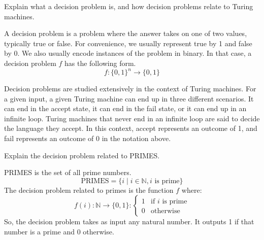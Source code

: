 \documentclass[a4paper, 12pt]{exam}
\begin{document}
\begin{questions}
\begin{solution}
  \end{solution}


\question
  Explain what a decision problem is, and how decision problems relate to Turing machines.
  \begin{solution}
    A decision problem is a problem where the answer takes on one of two values, typically true or false.
    For convenience, we usually represent true by 1 and false by 0.
    We also usually encode instances of the problem in binary.
    In that case, a decision problem $f$ has the following form.
      \[ f:\{0,1\}^n \rightarrow \{0,1\} \]
    
    Decision problems are studied extensively in the context of Turing machines.
    For a given input, a given Turing machine can end up in three different scenarios.
    It can end in the accept state, it can end in the fail state, or it can end up in an infinite loop.
    Turing machines that never end in an infinite loop are said to decide the language they accept.
    In this context, accept represents an outcome of 1, and fail represents an outcome of 0 in the notation above.
  \end{solution}


\question
  Explain the decision problem related to PRIMES.
  \begin{solution}
    PRIMES is the set of all prime numbers.
      $$ \textrm{PRIMES} = \{ i \mid i \in \mathbb{N} , i \textrm{ is prime} \} $$
    The decision problem related to primes is the function $f$ where:
      $$ f(i):\mathbb{N} \rightarrow \{0,1\}: \left\{
            \begin{array}{ll}
              1 & \textrm{if } i \textrm{ is prime} \\
              0 & \textrm{otherwise}
            \end{array}
        \right. $$
    So, the decision problem takes as input any natural number.
    It outputs 1 if that number is a prime and 0 otherwise.
  \end{solution}


\end{questions}
\end{document}
